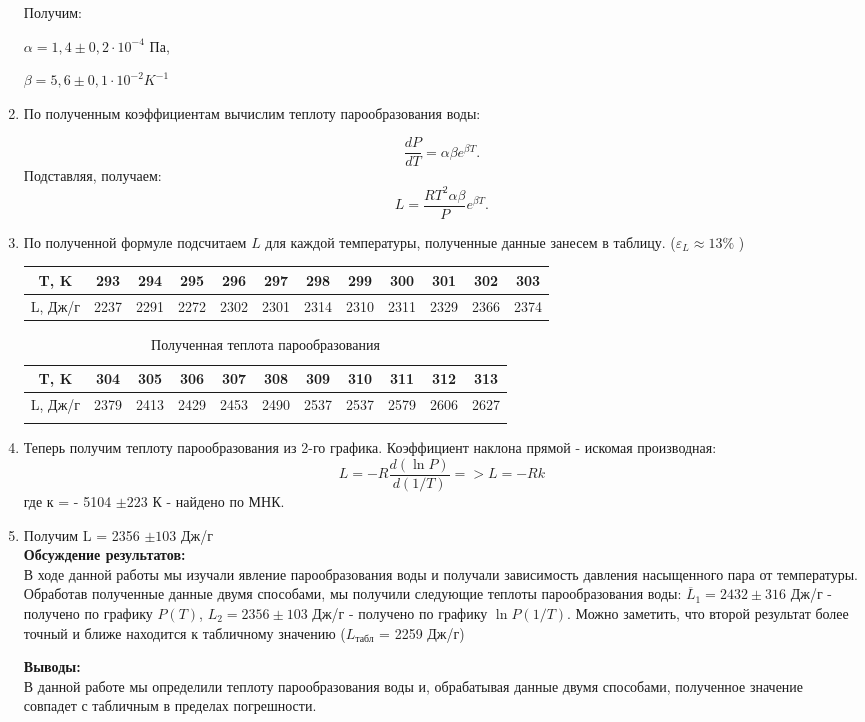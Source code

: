 \documentclass[a4paper, 12pt]{article}%
\begin{document}
\begin{enumerate}
	
	Получим: 
	
	$\alpha = 1,4 \pm 0,2 \cdot 10^{-4} $ Па, 
	
	$\beta = 5,6 \pm 0,1 \cdot 10^{-2} K^{-1}$ 
	
	
	\item По полученным коэффициентам вычислим теплоту парообразования воды:
	
	$$
	\frac{dP}{dT} = \alpha \beta e^{\beta T}.
    $$
    Подставляя, получаем:
    $$
    L=\frac{RT^2\alpha \beta }{P}e^{\beta T}.
    $$
	
	
	\item По полученной формуле подсчитаем $L$ для каждой температуры, полученные данные занесем в таблицу. ($\varepsilon_L \approx 13 \% $ )
	
	\begin{longtable}{|c|c|c|c|c|c|c|c|c|c|c|c|}
		\hline
	T, K& 293& 294& 295&296& 297& 298& 299& 300& 301& 302&303  \\ \hline
	L, Дж/г & 2237& 2291& 2272&2302 & 2301& 2314& 2310& 2311& 2329& 2366& 2374 \\ \hline
	\end{longtable}
	
		\begin{longtable}{|c|c|c|c|c|c|c|c|c|c|c|}\hline
		T, K& 304& 305& 306& 307& 308& 309& 310& 311& 312& 313   \\ \hline
		L, Дж/г & 2379& 2413& 2429& 2453& 2490& 2537& 2537& 2579& 2606& 2627  \\ \hline
		\caption{Полученная теплота парообразования}
	\end{longtable}
	
	
	\item Теперь получим теплоту парообразования из 2-го графика. Коэффициент наклона прямой - искомая производная:
	$$ L =-R\frac{d(\ln P)}{d(1/T)}  => L = -R k$$
	 где к = - 5104 $\pm 223$ К - найдено по МНК.
	\item Получим L = 2356 $\pm 103 $ Дж/г\\
	
	
	
	\textbf{Обсуждение результатов: }\\
	
	В ходе данной работы мы изучали явление парообразования воды и получали зависимость давления насыщенного пара от температуры. Обработав полученные данные двумя способами, мы получили следующие теплоты парообразования воды:
	$\overline L_1 = 2432 \pm 316$ Дж/г - получено по графику $P(T)$,
	$L_2 = 2356 \pm 103$ Дж/г - получено по графику  $\ln P(1/T)$.
	 Можно заметить, что второй результат более точный и ближе находится к табличному значению ($L_{\text{табл}}$ = 2259 Дж/г)
	
	
	\textbf{Выводы: }\\
	В данной работе мы определили теплоту парообразования воды и, обрабатывая данные двумя способами, полученное значение совпадет с табличным в пределах погрешности.
	
	
	\end{enumerate}
	
\end{document}
